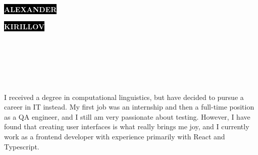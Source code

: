 \documentclass[9pt]{developercv} %
\begin{document}

\begin{minipage}[t]{0.39\textwidth}
	\vspace{-\baselineskip}

	\colorbox{black}{{{\fontsize{20}{30}\selectfont \textcolor{white}{\textbf{\MakeUppercase{Alexander}}}}}} %
	
	\colorbox{black}{{{\fontsize{20}{30}\selectfont \textcolor{white}{\textbf{\MakeUppercase{Kirillov}}}}}} %
	
	\vspace{8pt}
	
\end{minipage}
\begin{minipage}[t]{0.34\textwidth}
	\vspace{-\baselineskip}
	
	\vspace{5px}
	\\
	\\
\end{minipage}
\begin{minipage}[t]{0.27\textwidth}
	\vspace{-\baselineskip}
	
	\vspace{5px}
	\\
	\\
\end{minipage}

\vspace{1cm}


\medskip
{\large I received a degree in computational linguistics, but have decided to pursue a career in IT instead. My first job was an internship and then a full-time position as a QA engineer, and I still am very passionate about testing. However, I have found that creating user interfaces is what really brings me joy, and I currently work as a frontend developer with experience primarily with React and Typescript.}
\end{document}
